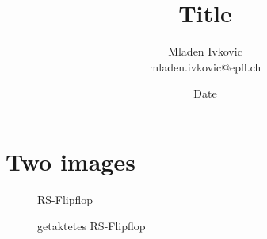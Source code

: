 


\title{Title}
\author{Mladen Ivkovic\\
mladen.ivkovic@epfl.ch\\
}
\date{Date}





\maketitle
\clearpage
\tableofcontents
\clearpage




















\section{Two images}

\begin{figure}[h!]
	\centering
		\centering
		\caption{RS-Flipflop}%
		\label{fig:rsflipflop}
	\endminipage\hspace{1cm}   
		\centering
		\caption{getaktetes RS-Flipflop}%
		\label{fig:rsflipfloptakt}
	\endminipage
\end{figure}





